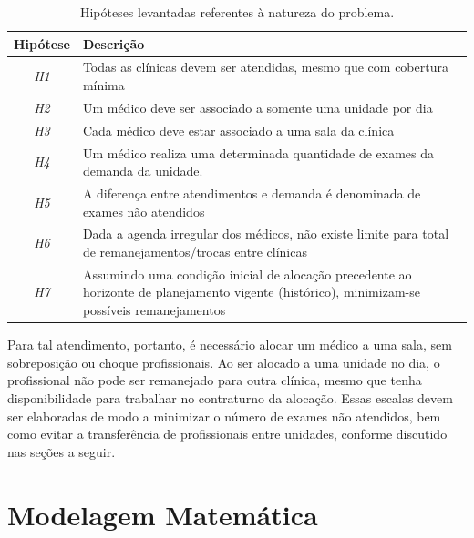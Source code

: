 \begin{table}[h]
	\centering
	\caption{Hipóteses levantadas referentes à natureza do problema.}
	\begin{tabular}{cM{12cm}}
		\toprule
		\textbf{Hipótese} & \textbf{Descrição}                                                                                                                \\
		\midrule
		\textit{H1}       & Todas as clínicas devem ser atendidas, mesmo que com cobertura mínima                                                             \\
		\textit{H2}       & Um médico deve ser associado a somente uma unidade  por dia                                                                       \\
		\textit{H3}       & Cada médico deve estar associado a uma sala da clínica                                                                            \\
		\textit{H4}       & Um médico realiza uma determinada quantidade de exames da demanda da unidade.                                                     \\
		\textit{H5}       & A diferença entre atendimentos e demanda é denominada de exames não atendidos                                                     \\
		\textit{H6}       & Dada a agenda irregular dos médicos, não existe limite para total de remanejamentos/trocas entre clínicas                         \\
		\textit{H7}       & Assumindo uma condição inicial de alocação precedente ao horizonte de planejamento vigente (histórico), minimizam-se possíveis remanejamentos \\
		\bottomrule
	\end{tabular}
	\label{tab:hipoteses-modelagem}
	\fautor
\end{table}

Para tal atendimento, portanto, é necessário alocar um médico a uma sala, sem sobreposição ou choque profissionais. Ao ser alocado a uma unidade no dia, o profissional não pode ser remanejado para outra clínica, mesmo que tenha disponibilidade para trabalhar no contraturno da alocação. Essas escalas devem ser elaboradas de modo a minimizar o número de exames não atendidos, bem como evitar a transferência de profissionais entre unidades, conforme discutido nas seções a seguir.

\section{Modelagem Matemática}

